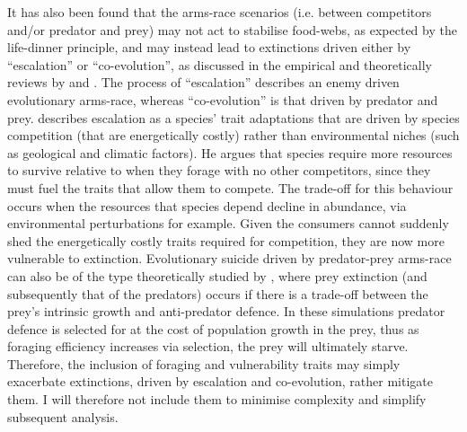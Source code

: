 \documentclass[a4paper]{report}
\begin{document}
It has also been found that the arms-race scenarios (i.e. between competitors and/or predator and prey) may not act to stabilise food-webs, as expected by the life-dinner principle, and may instead lead to extinctions driven either by “escalation” or “co-evolution”, as discussed in the empirical and theoretically reviews by \citep{Dietl2002} and \citep{Vermeij2013}. The process of “escalation” describes an enemy driven evolutionary arms-race, whereas “co-evolution” is that driven by predator and prey. \citep{Vermeij2013} describes escalation as a species’ trait adaptations that are driven by species competition (that are energetically costly) rather than environmental niches (such as geological and climatic factors). He argues that species require more resources to survive relative to when they forage with no other competitors, since they must fuel the traits that allow them to compete. The trade-off for this behaviour occurs when the resources that species depend decline in abundance, via environmental perturbations for example. Given the consumers cannot suddenly shed the energetically costly traits required for competition, they are now more vulnerable to extinction. Evolutionary suicide driven by predator-prey arms-race can also be of the type theoretically studied by \citep{Matsuda1994}, where prey extinction (and subsequently that of the predators) occurs if there is a trade-off between the prey’s intrinsic growth and anti-predator defence. In these simulations predator defence is selected for at the cost of population growth in the prey, thus as foraging efficiency increases via selection, the prey will ultimately starve. Therefore, the inclusion of foraging and vulnerability traits may simply exacerbate extinctions, driven by escalation and co-evolution, rather mitigate them. I will therefore not include them to minimise complexity and simplify subsequent analysis.\\
\end{document}
